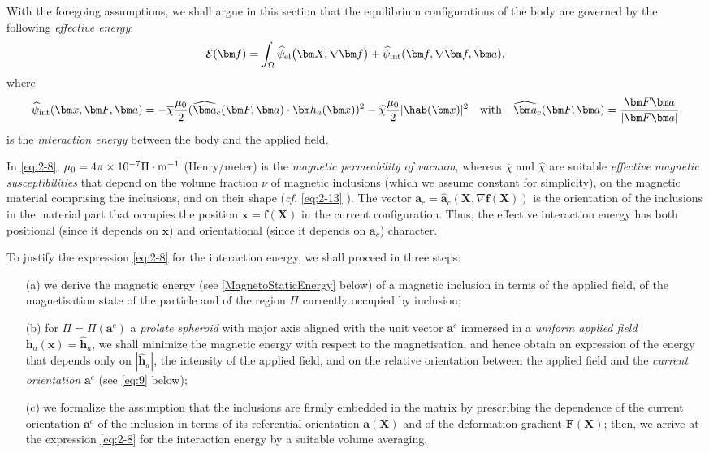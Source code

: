 \documentclass[oneside]{article}
\begin{document}
With the foregoing assumptions, we shall argue in this section that the equilibrium configurations of the body are governed by the following \emph{effective energy}:
\begin{equation}\label{eq:3002}
\mathcal{E}(\bm f)=\int_\Omega \widehat{\psi}_{\rm el}\big(\bm X,\nabla\bm f\big)+\widehat{\psi}_{\rm int}(\bm f,\nabla\bm f,\bm a),
\end{equation}
where 
\begin{equation}\label{eq:2-8}
\widehat\psi_{\rm int}(\bm x,\bm F,\bm a)=-
\overline\chi\frac{\mu_0}{2}(\widehat{\bm a}_c(\bm F,\bm a)\cdot\bm h_a(\bm x))^2-\widehat{\chi}\frac{\mu_0}{2} |\hab(\bm x)|^2\quad\text{with}
\quad\widehat{\bm a}_c(\bm F,\bm a)=\frac{\bm F\bm a}{|\bm F\bm a|}
\end{equation}
is the \emph{interaction energy} between the body and the applied field. 

In \eqref{eq:2-8}, $\mu_0 = 4\pi\times 10^{-7} {\rm H}\cdot {\rm m}^{-1}$ (Henry/meter) is the \emph{magnetic permeability of vacuum}, whereas  $\overline\chi$ and $\widehat{\chi}$ are suitable \emph{effective magnetic susceptibilities} that depend on the volume fraction $\nu$ of magnetic inclusions (which we assume constant for simplicity), on the magnetic material comprising the inclusions, and on their shape (\emph{cf.} \eqref{eq:2-13} ). The vector  $\bm a_c=\widehat{\bm a}_c(\bm X,\nabla\bm f(\bm X))$ is the orientation of the inclusions in the material part that occupies the position $\bm x=\bm f(\bm X)$ in the current configuration. Thus, the effective interaction energy has both positional (since it depends on $\bm x$) and orientational (since it depends on $\bm a_c$) character.



To justify the expression \eqref{eq:2-8} for the interaction energy, we shall proceed in three steps:
\begin{itemize}
	\item [(a)] we derive the magnetic energy (see \eqref{MagnetoStaticEnergy} below) of a magnetic inclusion in terms of the applied field, of the magnetisation state of the particle and of the region $\Pi$ currently occupied by inclusion;
	\item [(b)] for $\Pi=\Pi(\bm a^c)$ a \emph{prolate spheroid}  with major axis aligned with the unit vector $\bm a^c$ immersed in a \emph{uniform applied field} $\bm h_a(\bm x)=\widehat{\bm h}_a$, we shall minimize the magnetic energy with respect to the magnetisation, and hence obtain an expression of the energy that depends only on $|\widehat{\bm h}_a|$, the intensity of the applied field, and on the relative orientation between the applied field and the \emph{current orientation} $\bm a^c$ (see \eqref{eq:9} below);
	\item [(c)] we formalize the assumption that the inclusions are firmly embedded in the matrix by prescribing the dependence of the current orientation $\bm a^c$ of the inclusion in terms of its referential orientation $\bm a(\bm X)$ and of the deformation gradient $\bm F(\bm X)$; then, we arrive at the expression \eqref{eq:2-8} for the interaction energy by a suitable volume averaging.
\end{itemize}
%
\end{document}
